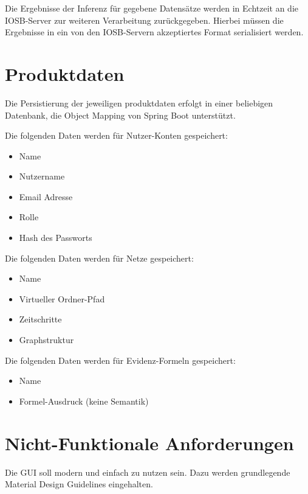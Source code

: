 \documentclass[parskip=full,11pt,twoside]{scrartcl}
\begin{document}
Die Ergebnisse der Inferenz für gegebene Datensätze werden in Echtzeit an die IOSB-Server zur weiteren Verarbeitung zurückgegeben. Hierbei müssen die Ergebnisse in ein von den IOSB-Servern akzeptiertes Format serialisiert werden.

\section{Produktdaten}
Die Persistierung der jeweiligen \Gls{produktdaten} erfolgt in einer beliebigen Datenbank, die Object Mapping von Spring Boot unterstützt.

Die folgenden Daten werden für Nutzer-Konten gespeichert:
\begin{itemize}
  \item Name
  \item Nutzername
  \item Email Adresse
  \item Rolle
  \item Hash des Passworts
\end{itemize}
\pagebreak
{}
Die folgenden Daten werden für Netze gespeichert:
\begin{itemize}
  \item Name
  \item Virtueller Ordner-Pfad
  \item Zeitschritte
  \item Graphstruktur
\end{itemize}

Die folgenden Daten werden für Evidenz-Formeln gespeichert:
\begin{itemize}
  \item Name
  \item Formel-Ausdruck (keine Semantik)
\end{itemize}

\section{Nicht-Funktionale Anforderungen}


Die GUI soll modern und einfach zu nutzen sein. Dazu werden grundlegende Material Design Guidelines eingehalten.

\end{document}
